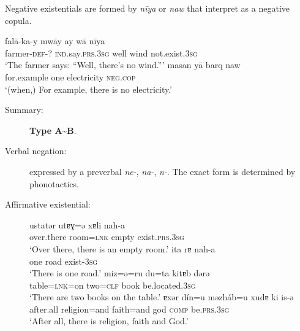 \documentclass[output=paper,colorlinks,citecolor=brown]{langscibook}
\begin{document}
\begin{paperappendix}
\begin{unindented}
Negative existentials are formed by \textit{nīya} or \textit{naw} that
\citeauthor{MahmoudveysiBailey2012} interpret as a negative copula. 
%
\begin{exe}\ex
    \gll falā-ka-y mwāy ay     wā     nīya \\
farmer-\textsc{def}-?   \textsc{ind}.say.\textsc{prs}.\textsc{3sg}  well  wind  not.exist.\textsc{3sg} \\
    \glt `The farmer says: “Well, there's no wind.”'
\parencite[61]{MahmoudveysiBailey2012}
\ex \gll masan yā   barq         naw \\
for.example one electricity \textsc{neg.cop} \\
    \glt `(when,) For example, there is no electricity.'
\parencite[159]{MahmoudveysiBailey2012}
    \end{exe}

\begin{description}
\item[Summary:] \textbf{Type A{\textasciitilde}B}.
\end{description}

 \parencite{RastorguevaKerimova2012}
\begin{description}
\item [Verbal negation:]  expressed by a preverbal \textit{ne-}, \textit{na-}, \textit{n-}. The exact form is determined by phonotactics. 

\item[Affirmative existential:]

\begin{exe}\ex \gll ustatər utɐɣ=ə xɐli nah-a \\
over.there  room=\textsc{lnk}  empty exist.\textsc{prs.3sg} \\
    \glt `Over there, there is an empty room.' \parencite[310]{RastorguevaKerimova2012}
\ex \gll ita   rɐ    nah-a \\
one road exist-\textsc{3sg} \\
    \glt `There is one road.' \parencite[318]{RastorguevaKerimova2012}
\ex \gll miz=ə=ru du=ta kitɐb dərə \\
table=\textsc{lnk}=on  two=\textsc{clf}   book be.located.\textsc{3sg} \\
    \glt `There are two books on the table.' \parencite[134]{RastorguevaKerimova2012}
\ex \gll ɐxər dín=u məzháb=u xudɐ ki is-ə \\
after.all religion=and faith=and   god   \textsc{comp}    be.\textsc{prs.3sg} \\
    \glt `After all, there is religion, faith and God.' \parencite[275]{RastorguevaKerimova2012} 
\end{exe}


\end{description}
\end{unindented}
\end{paperappendix}
\end{document}
